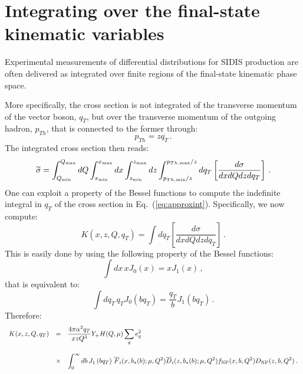 \documentclass[10pt,a4paper]{article}
\begin{document}
\section{Integrating over the final-state kinematic variables}

Experimental measurements of differential distributions for SIDIS
production are often delivered as integrated over finite regions of
the final-state kinematic phase space. 

More specifically, the cross section is not integrated of the
transverse momentum of the vector boson, $q_T$, but over the
transverse momentum of the outgoing hadron, $p_{Th}$, that is
connected to the former through:
\begin{equation}
p_{Th} = zq_T\,.
\end{equation}
The integrated cross section then reads:
\begin{equation}\label{eq:IntcrosssectionSIDIS}
  \widetilde{\sigma}=\int_{Q_{\rm min}}^{Q_{\rm max}}dQ \int_{x_{\rm min}}^{x_{\rm max}}dx
  \int_{z_{\rm
      min}}^{z_{\rm max}}dz \int_{p_{Th,\rm min}/z}^{p_{Th,\rm max}/z}dq_{T}\left[\frac{d\sigma}{dxdQ
      dz dq_{T}} \right]\,.
\end{equation}
One can exploit a property of the Bessel functions to compute the
indefinite integral in $q_{T}$ of the cross section in
Eq.~(\ref{eq:approxint}). Specifically, we now compute:
\begin{equation}
  K(x,z,Q,q_{T}) = \int dq_{T}\left[\frac{d\sigma}{dxdQdz dq_{T}}\right]\,.
\end{equation}
This is easily done by using the following property of the Bessel
functions:
\begin{equation}
\int dx\,x J_0(x) = xJ_1(x)\,,
\end{equation}
that is equivalent to:
\begin{equation}
  \int dq_{T}\,q_{T} J_0\left(bq_T\right) = \frac{q_T}{b}J_1\left(bq_T\right)\,.
\end{equation}
Therefore:
\begin{equation}
\begin{array}{rcl}
\displaystyle   K(x,z,Q,q_{T}) &=&\displaystyle
\frac{4\pi \alpha^2q_{T}}{xzQ^3}Y_+ H(Q,\mu) \sum_q e_q^2\\
\\
&\times&\displaystyle 
  \int_0^\infty db\, J_1\left(bq_T\right)
         \,\overline{F}_i(x,b_*(b);\mu,Q^2)
         \overline{D}_i(z,b_*(b);\mu,Q^2) f_{\rm NP}(x,b,Q^2) D_{\rm NP}(z,b,Q^2)\,.
\end{array}
\end{equation}
\end{document}
